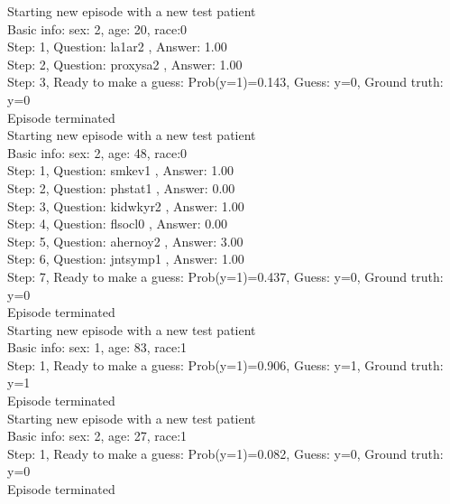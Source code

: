 \documentclass[reqno,11pt]{article}
\begin{document}
\noindent Starting new episode with a new test patient \\ [0.5ex] 
Basic info: sex: 2, age: 20, race:0 \\ [0.5ex] 
Step: 1, Question:  la1ar2 , Answer: 1.00 \\ [0.5ex] 
Step: 2, Question:  proxysa2 , Answer: 1.00 \\ [0.5ex] 
Step: 3, Ready to make a guess: Prob(y=1)=0.143, Guess: y=0, Ground truth: y=0 \\ [0.5ex] 
Episode terminated \\ [0.5ex] 

\noindent Starting new episode with a new test patient \\ [0.5ex] 
Basic info: sex: 2, age: 48, race:0 \\ [0.5ex] 
Step: 1, Question:  smkev1 , Answer: 1.00 \\ [0.5ex] 
Step: 2, Question:  phstat1 , Answer: 0.00 \\ [0.5ex] 
Step: 3, Question:  kidwkyr2 , Answer: 1.00 \\ [0.5ex] 
Step: 4, Question:  flsocl0 , Answer: 0.00 \\ [0.5ex] 
Step: 5, Question:  ahernoy2 , Answer: 3.00 \\ [0.5ex] 
Step: 6, Question:  jntsymp1 , Answer: 1.00 \\ [0.5ex] 
Step: 7, Ready to make a guess: Prob(y=1)=0.437, Guess: y=0, Ground truth: y=0 \\ [0.5ex] 
Episode terminated \\ [0.5ex] 

\noindent Starting new episode with a new test patient \\ [0.5ex] 
Basic info: sex: 1, age: 83, race:1 \\ [0.5ex] 
Step: 1, Ready to make a guess: Prob(y=1)=0.906, Guess: y=1, Ground truth: y=1 \\ [0.5ex] 
Episode terminated \\ [0.5ex] 

\noindent Starting new episode with a new test patient \\ [0.5ex] 
Basic info: sex: 2, age: 27, race:1 \\ [0.5ex] 
Step: 1, Ready to make a guess: Prob(y=1)=0.082, Guess: y=0, Ground truth: y=0 \\ [0.5ex] 
Episode terminated \\ [0.5ex] 
\end{document}
